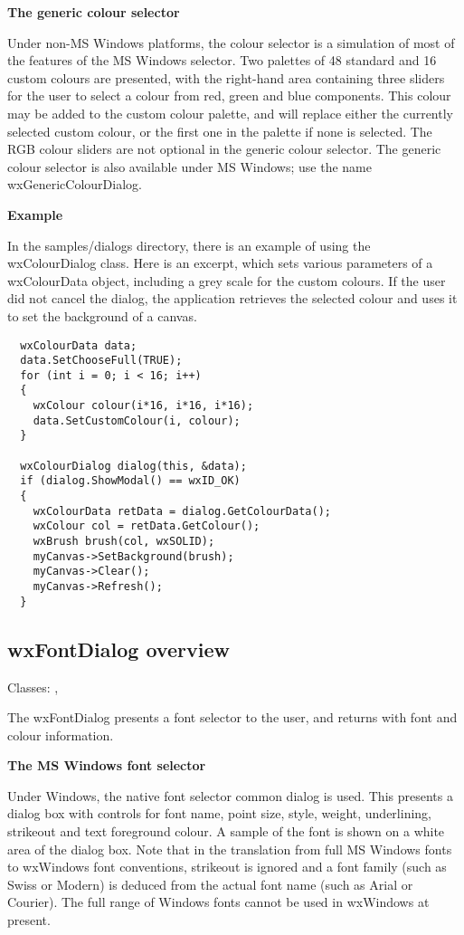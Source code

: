 {\bf The generic colour selector}

Under non-MS Windows platforms, the colour selector is a simulation of
most of the features of the MS Windows selector. Two palettes of 48
standard and 16 custom colours are presented, with the right-hand area
containing three sliders for the user to select a colour from red,
green and blue components. This colour may be added to the custom colour
palette, and will replace either the currently selected custom colour,
or the first one in the palette if none is selected. The RGB colour sliders
are not optional in the generic colour selector. The generic colour
selector is also available under MS Windows; use the name
wxGenericColourDialog.

{\bf Example}

In the samples/dialogs directory, there is an example of using
the wxColourDialog class. Here is an excerpt, which
sets various parameters of a wxColourData object, including
a grey scale for the custom colours. If the user did not cancel
the dialog, the application retrieves the selected colour and
uses it to set the background of a canvas.

\begin{verbatim}
  wxColourData data;
  data.SetChooseFull(TRUE);
  for (int i = 0; i < 16; i++)
  {
    wxColour colour(i*16, i*16, i*16);
    data.SetCustomColour(i, colour);
  }
      
  wxColourDialog dialog(this, &data);
  if (dialog.ShowModal() == wxID_OK)
  {
    wxColourData retData = dialog.GetColourData();
    wxColour col = retData.GetColour();
    wxBrush brush(col, wxSOLID);
    myCanvas->SetBackground(brush);
    myCanvas->Clear();
    myCanvas->Refresh();
  }
\end{verbatim}


\subsection{wxFontDialog overview}\label{wxfontdialogoverview}

Classes: , 

The wxFontDialog presents a font selector to the user, and returns
with font and colour information.

{\bf The MS Windows font selector}

Under Windows, the native font selector common dialog is used. This
presents a dialog box with controls for font name, point size, style, weight,
underlining, strikeout and text foreground colour. A sample of the
font is shown on a white area of the dialog box. Note that
in the translation from full MS Windows fonts to wxWindows font
conventions, strikeout is ignored and a font family (such as
Swiss or Modern) is deduced from the actual font name (such as Arial
or Courier). The full range of Windows fonts cannot be used in wxWindows
at present.


